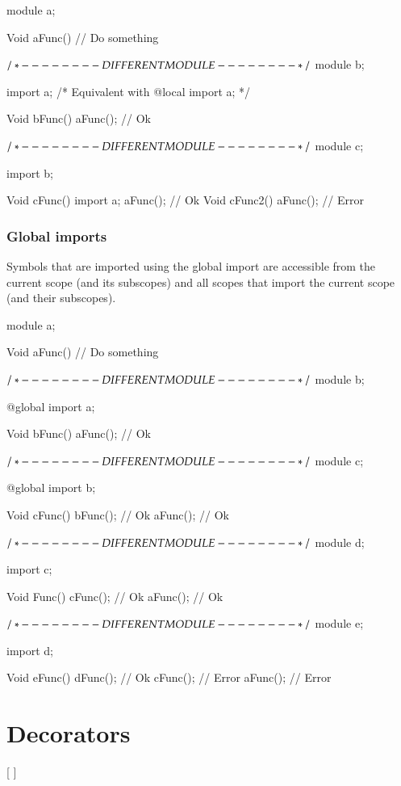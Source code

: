 \begin{code}
module a;

Void aFunc() {
	// Do something
}

$/* - - - - - - - - DIFFERENT MODULE - - - - - - - - */$
module b;

import a; /* Equivalent with @local import a; */

Void bFunc() {
	aFunc(); // Ok
}

$/* - - - - - - - - DIFFERENT MODULE - - - - - - - - */$
module c;

import b;

Void cFunc() {
	import a;
	aFunc(); // Ok
}
Void cFunc2() {
	aFunc(); // Error	
}
\end{code}

\subsection{Global imports} \label{decorator:global}
Symbols that are imported using the global import are accessible from the current scope (and its subscopes) and all scopes that import the current scope (and their subscopes).

\begin{code}
module a;

Void aFunc() {
	// Do something
}

$/* - - - - - - - - DIFFERENT MODULE - - - - - - - - */$
module b;

@global import a;

Void bFunc() {
	aFunc(); // Ok
}

$/* - - - - - - - - DIFFERENT MODULE - - - - - - - - */$
module c;

@global import b;

Void cFunc() {
	bFunc(); // Ok
	aFunc(); // Ok	
}

$/* - - - - - - - - DIFFERENT MODULE - - - - - - - - */$
module d;

import c;

Void Func() {
	cFunc(); // Ok
	aFunc(); // Ok
}

$/* - - - - - - - - DIFFERENT MODULE - - - - - - - - */$
module e;

import d;

Void eFunc() {
	dFunc(); // Ok
	cFunc(); // Error
	aFunc(); // Error	
}
\end{code}

\chapter{Decorators}

\begin{grammar}
	   [  ]
\end{grammar}

